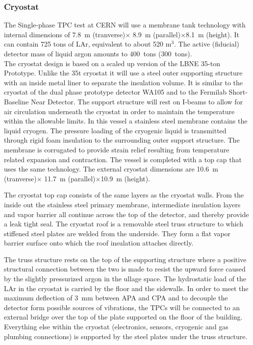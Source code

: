\subsubsection{Cryostat}

The Single-phase TPC test at CERN will use a membrane tank technology with internal dimensions of 
7.8~m (tranverse)$\times$ 8.9~m (parallel)$\times$8.1~m (height). 
It can contain  725 tons of LAr, equivalent to about 520 m$^3$. The active (fiducial) detector mass of liquid argon amounts to 400~tons (300~tons).\\
The cryostat design is based on a scaled up version of the LBNE 35-ton Prototype\cite{montanari_35ton}. 
Unlike the 35t cryostat it will use a steel outer supporting structure with an inside metal liner to separate the insulation volume. It is similar to the cryostat of the dual phase prototype detector WA105 and to the Fermilab Short-Baseline Near Detector. The support structure will rest on I-beams to allow for air circulation underneath the cryostat in order to maintain the temperature within the allowable limits.
In this vessel a stainless steel membrane contains the liquid cryogen. The pressure loading of the cryogenic liquid is transmitted through rigid foam insulation to the surrounding outer support structure. The membrane is corrugated to provide strain relief resulting from temperature related expansion and contraction. The vessel is completed with a top cap that uses the same technology.
The external cryostat dimensions are 10.6~m (tranverse)$\times$ 11.7~m (parallel)$\times$10.9~m (height). 


The cryostat top cap consists of the same layers as the cryostat walls. From the inside out
the stainless steel primary membrane, intermediate insulation layers and vapor barrier all continue across 
the top of the detector, and thereby provide a leak tight seal. 
The cryostat roof is a removable steel truss structure 
to which stiffened steel plates are welded from the 
underside. They form a flat vapor barrier surface onto which the roof insulation attaches directly. 

The truss structure rests on the top of the supporting structure where a positive structural connection 
between the two is made to resist the upward force caused by the slightly pressurized argon in the ullage 
space. The hydrostatic load of the LAr in the cryostat is carried by the floor and the sidewalls. In order to meet the maximum deflection of 3~mm between APA and CPA and to decouple the detector form possible sources of vibrations, the TPCs will be connected to an external bridge over the top of the plate supported on the floor of the building. Everything else within the cryostat 
(electronics, sensors, cryogenic and gas plumbing connections) is 
supported by the steel plates under the truss structure. 

